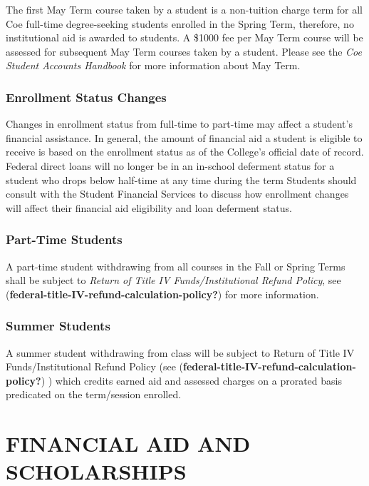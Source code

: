 \documentclass[
  letterpaper,
]{scrbook}
\begin{document}
The first May Term course taken by a student is a non-tuition charge
term for all Coe full-time degree-seeking students enrolled in the
Spring Term, therefore, no institutional aid is awarded to students. A
\$1000 fee per May Term course will be assessed for subsequent May Term
courses taken by a student. Please see the \emph{Coe Student Accounts
Handbook} for more information about May Term.

\hypertarget{enrollment-status-changes}{%
\subsection{Enrollment Status Changes}\label{enrollment-status-changes}}

Changes in enrollment status from full-time to part-time may affect a
student's financial assistance. In general, the amount of financial aid
a student is eligible to receive is based on the enrollment status as of
the College's official date of record. Federal direct loans will no
longer be in an in-school deferment status for a student who drops below
half-time at any time during the term Students should consult with the
Student Financial Services to discuss how enrollment changes will affect
their financial aid eligibility and loan deferment status.

\hypertarget{part-time-students}{%
\subsection{Part-Time Students}\label{part-time-students}}

A part-time student withdrawing from all courses in the Fall or Spring
Terms shall be subject to \emph{Return of Title IV Funds/Institutional
Refund Policy}, see
(\textbf{federal-title-IV-refund-calculation-policy?}) for more
information.

\hypertarget{summer-students}{%
\subsection{Summer Students}\label{summer-students}}

A summer student withdrawing from class will be subject to Return of
Title IV Funds/Institutional Refund Policy (see
(\textbf{federal-title-IV-refund-calculation-policy?}) ) which credits
earned aid and assessed charges on a prorated basis predicated on the
term/session enrolled.

\hypertarget{financial-aid-and-scholarships}{%
\chapter{FINANCIAL AID AND
SCHOLARSHIPS}\label{financial-aid-and-scholarships}}
\end{document}
